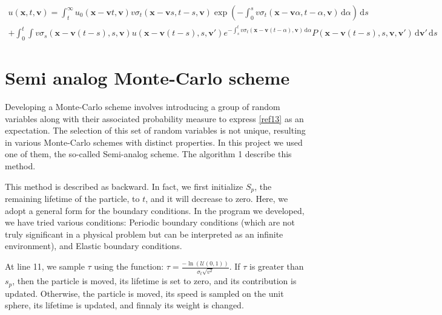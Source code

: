 \documentclass[a4paper, 11pt]{article}
\newcommand{\bm}{\symbf}
\newcommand{\di}{\ensuremath{\, \mathrm{d}}}
\begin{document}
\begin{multline}
u(\bm{x},t,\bm{v}) =  \int _t^\infty  u_0(\bm{x} - \bm{v}t, \bm{v}) v\sigma_t\left(\bm{x} - \bm{v} s,t- s, \bm{v}\right) \exp\left(- \int_{0}^{s} v\sigma_t\left(\bm{x} - \bm{v} \alpha,t- \alpha, \bm{v}\right) \di\alpha\right) \di s\\
+ \int_{0}^{t} \int v\sigma_s\left(\bm{x} - \bm{v}(t - s), s, \bm{v}\right) u\left(\bm{x} - \bm{v}(t - s), s, \bm{v}'\right) e^{- \int_s^t v\sigma_t\left(\bm{x} - \bm{v}(t - \alpha), \bm{v}\right) \di\alpha} P\left(\bm{x} - \bm{v}(t - s), s, \bm{v}, \bm{v}'\right) \di\bm{v}'\di s \label{ref13}
\end{multline}


\section{Semi analog Monte-Carlo scheme}

Developing a Monte-Carlo scheme involves introducing a group of random variables along with their associated probability measure to express \eqref{ref13} as an expectation. The selection of this set of random variables is not unique, resulting in various Monte-Carlo schemes with distinct properties. In this project we used one of them, the so-called Semi-analog scheme. The algorithm 1 describe this method.



This method is described as backward. In fact, we first initialize $S_p$, the remaining lifetime of the particle, to $t$, and it will decrease to zero. Here, we adopt a general form for the boundary conditions. In the program we developed, we have tried various conditions: Periodic boundary conditions (which are not truly significant in a physical problem but can be interpreted as an infinite environment), and Elastic boundary conditions.

At line 11, we sample $\tau$ using the function: $\tau = \frac{-\ln(\mathcal{U}(0,1))}{\sigma_t \sqrt{v^2}}$. If $\tau$ is greater than $s_p$, then the particle is moved, its lifetime is set to zero, and its contribution is updated. Otherwise, the particle is moved, its speed is sampled on the unit sphere, its lifetime is updated, and finnaly its weight is changed.
\end{document}
